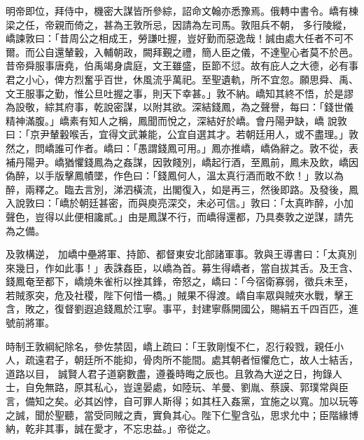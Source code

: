 \begin{pinyinscope}
 明帝即位，拜侍中，機密大謀皆所參綜，詔命文翰亦悉豫焉。俄轉中書令。嶠有棟梁之任，帝親而倚之，甚為王敦所忌，因請為左司馬。敦阻兵不朝，
 多行陵縱，嶠諫敦曰：「昔周公之相成王，勞謙吐握，豈好勤而惡逸哉！誠由處大任者不可不爾。而公自還輦轂，入輔朝政，闕拜覲之禮，簡人臣之儀，不達聖心者莫不於邑。昔帝舜服事唐堯，伯禹竭身虞庭，文王雖盛，臣節不愆。故有庇人之大德，必有事君之小心，俾方烈奮乎百世，休風流乎萬祀。至聖遺軌，所不宜忽。願思舜、禹、文王服事之勤，惟公旦吐握之事，則天下幸甚。」敦不納。嶠知其終不悟，於是謬為設敬，綜其府事，乾說密謀，以附其欲。深結錢鳳，為之聲譽，每曰：「錢世儀精神滿腹。」嶠素有知人之稱，鳳聞而悅之，深結好於嶠。會丹陽尹缺，嶠
 說敦曰：「京尹輦轂喉舌，宜得文武兼能，公宜自選其才。若朝廷用人，或不盡理。」敦然之，問嶠誰可作者。嶠曰：「愚謂錢鳳可用。」鳳亦推嶠，嶠偽辭之。敦不從，表補丹陽尹。嶠猶懼錢鳳為之姦謀，因敦餞別，嶠起行酒，至鳳前，鳳未及飲，嶠因偽醉，以手版擊鳳幘墜，作色曰：「錢鳳何人，溫太真行酒而敢不飲！」敦以為醉，兩釋之。臨去言別，涕泗橫流，出閣復入，如是再三，然後即路。及發後，鳳入說敦曰：「嶠於朝廷甚密，而與庾亮深交，未必可信。」敦曰：「太真昨醉，小加聲色，豈得以此便相讒貳。」由是鳳謀不行，而嶠得還都，乃具奏敦之逆謀，請先為之備。



 及敦構逆，
 加嶠中壘將軍、持節、都督東安北部諸軍事。敦與王導書曰：「太真別來幾日，作如此事！」表誅姦臣，以嶠為首。募生得嶠者，當自拔其舌。及王含、錢鳳奄至都下，嶠燒朱雀桁以挫其鋒，帝怒之，嶠曰：「今宿衛寡弱，徵兵未至，若賊豕突，危及社稷，陛下何惜一橋。」賊果不得渡。嶠自率眾與賊夾水戰，擊王含，敗之，復督劉遐追錢鳳於江寧。事平，封建寧縣開國公，賜絹五千四百匹，進號前將軍。



 時制王敦綱紀除名，參佐禁固，嶠上疏曰：「王敦剛愎不仁，忍行殺戮，親任小人，疏遠君子，朝廷所不能抑，骨肉所不能間。處其朝者恒懼危亡，故人士結舌，道路以目，
 誠賢人君子道窮數盡，遵養時晦之辰也。且敦為大逆之日，拘錄人士，自免無路，原其私心，豈遑晏處，如陸玩、羊曼、劉胤、蔡謨、郭璞常與臣言，備知之矣。必其凶悖，自可罪人斯得；如其枉入姦黨，宜施之以寬。加以玩等之誠，聞於聖聽，當受同賊之責，實負其心。陛下仁聖含弘，思求允中；臣階緣博納，乾非其事，誠在愛才，不忘忠益。」帝從之。




\end{pinyinscope}
